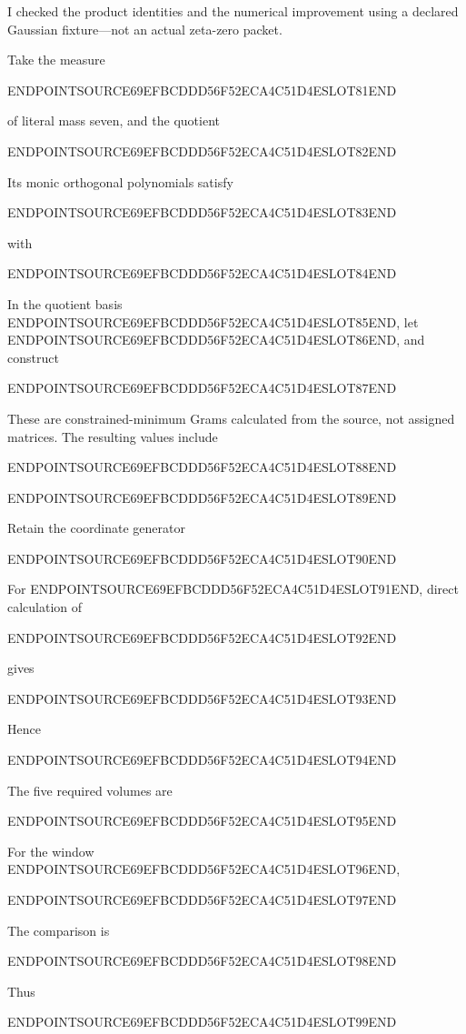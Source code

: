 I checked the product identities and the numerical improvement using a declared Gaussian fixture---not an actual zeta-zero packet.

Take the measure

ENDPOINTSOURCE69EFBCDDD56F52ECA4C51D4ESLOT81END

of literal mass seven, and the quotient

ENDPOINTSOURCE69EFBCDDD56F52ECA4C51D4ESLOT82END

Its monic orthogonal polynomials satisfy

ENDPOINTSOURCE69EFBCDDD56F52ECA4C51D4ESLOT83END

with

ENDPOINTSOURCE69EFBCDDD56F52ECA4C51D4ESLOT84END

In the quotient basis ENDPOINTSOURCE69EFBCDDD56F52ECA4C51D4ESLOT85END, let ENDPOINTSOURCE69EFBCDDD56F52ECA4C51D4ESLOT86END, and construct

ENDPOINTSOURCE69EFBCDDD56F52ECA4C51D4ESLOT87END

These are constrained-minimum Grams calculated from the source, not assigned matrices. The resulting values include

ENDPOINTSOURCE69EFBCDDD56F52ECA4C51D4ESLOT88END

ENDPOINTSOURCE69EFBCDDD56F52ECA4C51D4ESLOT89END

Retain the coordinate generator

ENDPOINTSOURCE69EFBCDDD56F52ECA4C51D4ESLOT90END

For ENDPOINTSOURCE69EFBCDDD56F52ECA4C51D4ESLOT91END, direct calculation of

ENDPOINTSOURCE69EFBCDDD56F52ECA4C51D4ESLOT92END

gives

ENDPOINTSOURCE69EFBCDDD56F52ECA4C51D4ESLOT93END

Hence

ENDPOINTSOURCE69EFBCDDD56F52ECA4C51D4ESLOT94END

The five required volumes are

ENDPOINTSOURCE69EFBCDDD56F52ECA4C51D4ESLOT95END

For the window ENDPOINTSOURCE69EFBCDDD56F52ECA4C51D4ESLOT96END,

ENDPOINTSOURCE69EFBCDDD56F52ECA4C51D4ESLOT97END

The comparison is

ENDPOINTSOURCE69EFBCDDD56F52ECA4C51D4ESLOT98END

Thus

ENDPOINTSOURCE69EFBCDDD56F52ECA4C51D4ESLOT99END

